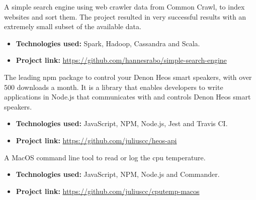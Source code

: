 
A simple search engine using web crawler data from Common Crawl, to index websites and sort them. The project resulted in very successful results with an extremely small subset of the available data.

\vspace{6pt}

\begin{itemize}
    \item \textbf{Technologies used:} Spark, Hadoop, Cassandra and Scala.
    \item \textbf{Project link:} \href{https://github.com/hannesrabo/simple-search-engine}{https://github.com/hannesrabo/simple-search-engine}
\end{itemize}

\divider

The leading npm package to control your Denon Heos smart speakers, with over 500 downloads a month. It is a library that enables developers to write applications in Node.js that communicates with and controls Denon Heos smart speakers.

\vspace{6pt}

\begin{itemize}
    \item \textbf{Technologies used:} JavaScript, NPM, Node.js, Jest and Travis CI.
    \item \textbf{Project link:} \href{https://github.com/juliuscc/heos-api}{https://github.com/juliuscc/heos-api}
\end{itemize}

\divider


A MacOS command line tool to read or log the cpu temperature.

\vspace{6pt}

\begin{itemize}
    \item \textbf{Technologies used:} JavaScript, NPM, Node.js and Commander.
    \item \textbf{Project link:} \href{https://github.com/juliuscc/cputemp-macos}{https://github.com/juliuscc/cputemp-macos}
\end{itemize}
